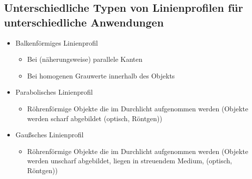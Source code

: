 \documentclass[11pt]{article}
\begin{document}
\subsection{Unterschiedliche Typen von Linienprofilen für unterschiedliche Anwendungen}
\begin{itemize}
    \item Balkenförmiges Linienprofil
    \begin{itemize}
        \item Bei (näherungsweise) parallele Kanten
        \item Bei homogenen Grauwerte innerhalb des Objekts
    \end{itemize}
    \item Parabolisches Linienprofil
    \begin{itemize}
        \item Röhrenförmige Objekte die im Durchlicht aufgenommen werden (Objekte werden scharf abgebildet (optisch, Röntgen))
    \end{itemize}
    \item Gaußsches Linienprofil
    \begin{itemize}
        \item Röhrenförmige Objekte die im Durchlicht aufgenommen werden (Objekte werden unscharf abgebildet, liegen in streuendem Medium, (optisch, Röntgen))
    \end{itemize}

\end{itemize}
\end{document}
